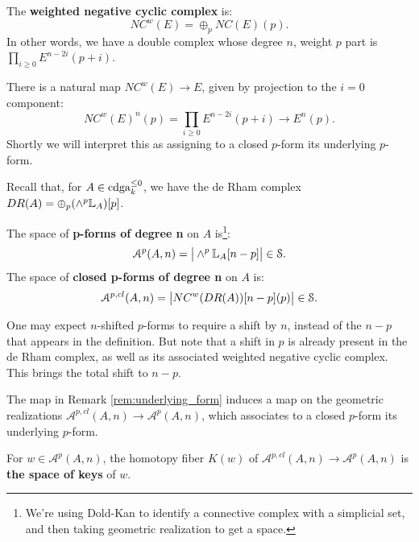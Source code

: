 \begin{defin}
The \textbf{weighted negative cyclic complex} is:
\[	NC^w(E) = \oplus_p NC(E)(p).	\]
In other words, we have a double complex whose degree $n$, weight $p$ part is $\prod_{i\geq 0}
E^{n-2i}(p+i)$.
\end{defin}


\begin{rem}
\label{rem:underlying_form}
There is a natural map $NC^w(E) \to E$, given by projection to the $i=0$ component:
\[	NC^w(E)^n(p) = \prod_{i\geq 0} E^{n-2i}(p+i) \to E^n(p) .	\]
Shortly we will interpret this as assigning to a closed $p$-form its underlying $p$-form.
\end{rem}

Recall that, for $A \in \operatorname{cdga}_k^{\leq 0}$, we have the de Rham complex $DR(A) = \oplus_p(\wedge^p \mathbb L_A)[p]$.
\begin{defin}
The space of \textbf{p-forms of degree n} on $A$ is\footnote{We're using Dold-Kan to identify a connective complex
with a simplicial set, and then taking geometric realization to get a space.}:
\[	\mathcal{A}^p(A,n) = \big| \wedge^p \mathbb L_A [n-p] \big| \in \mathcal S.	\]
The space of \textbf{closed p-forms of degree n} on $A$ is:
\[	\mathcal{A}^{p,cl}(A,n) = \big|NC^w(DR(A))[n-p](p) \big| \in \mathcal S.	\]
\end{defin}

\begin{rem}
One may expect $n$-shifted $p$-forms to require a shift by $n$, instead of the $n-p$ that appears in the definition.
But note that a shift in $p$ is already present in the de Rham complex, as well as its associated weighted negative cyclic
complex. This brings the total shift to $n-p$.
\end{rem}

\begin{rem}
The map in Remark \ref{rem:underlying_form} induces a map on the geometric realizations $\mathcal{A}^{p,cl}(A,n)
\to \mathcal{A}^p(A,n)$, which associates to a closed $p$-form its underlying $p$-form.
\end{rem}

\begin{defin}
For $w \in \mathcal{A}^p(A,n)$, the homotopy fiber $K(w)$ of $\mathcal{A}^{p,cl}(A,n) \to \mathcal{A}^p(A,n)$ is
\textbf{the space of keys} of $w$.
\end{defin}

